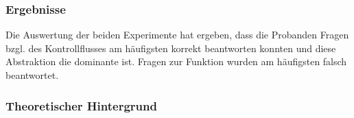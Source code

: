 \subsubsection{Ergebnisse}

Die Auswertung der beiden Experimente hat ergeben, dass die Probanden Fragen bzgl. des Kontrollflusses am häufigsten korrekt beantworten konnten und diese Abstraktion die dominante ist. Fragen zur Funktion wurden am häufigsten falsch beantwortet.

\subsubsection{Theoretischer Hintergrund}

